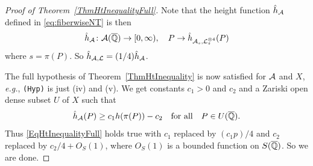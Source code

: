 \begin{proof}[Proof of Theorem~\ref{ThmHtInequalityFull}]
Note that the height function $\hat{h}_{\mathcal{A}}$ defined in \eqref{eq:fiberwiseNT} is then
\[
\hat{h}_{\mathcal{A}} \colon \mathcal{A}({\overline{\mathbb{Q}}}) \rightarrow [0,\infty), \quad P \rightarrow \hat{h}_{\mathcal{A}_s,{\mathcal L}_s^{\otimes 4}}(P)
\]
where $s = \pi(P)$. So $\hat{h}_{\mathcal{A},{\mathcal L}} = (1/4)\hat{h}_{\mathcal{A}}$. 


The full
hypothesis of Theorem~\ref{ThmHtInequality}  is now satisfied for $\mathcal{A}$
and $X$,
\textit{e.g.}, \texttt{(Hyp)} is just (iv) and (v).
We get constants $c_1> 0$ and $c_2$ and a Zariski open dense subset $U$ of $X$ such that
\[
    \hat{h}_{\mathcal{A}}(P) \ge c_1 h( \pi(P) ) - c_2 \quad \text{for all}\quad P \in U({\overline{\mathbb{Q}}}).
\]
Thus \eqref{EqHtInequalityFull} holds true with $c_1$ replaced by $(c_1p)/4$ and $c_2$ replaced by $c_2/4 + O_S(1)$, where $O_S(1)$ is a bounded function on $S({\overline{\mathbb{Q}}})$. So we are done.
\end{proof}



